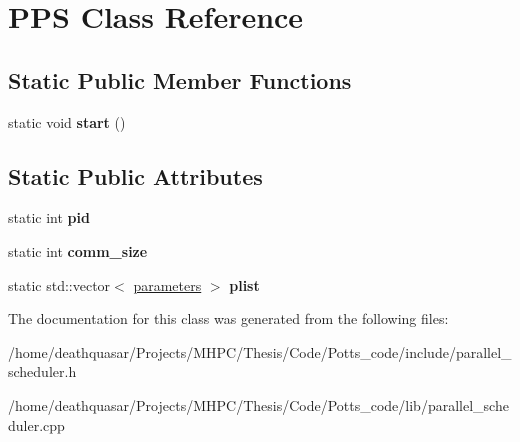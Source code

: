\hypertarget{classPPS}{}\section{P\+PS Class Reference}
\label{classPPS}
\subsection*{Static Public Member Functions}
\begin{DoxyCompactItemize}
\item 
static void {\bfseries start} ()\hypertarget{classPPS_a25cae7ae5a03f02d8c44b2b9b163ebe6}{}\label{classPPS_a25cae7ae5a03f02d8c44b2b9b163ebe6}

\end{DoxyCompactItemize}
\subsection*{Static Public Attributes}
\begin{DoxyCompactItemize}
\item 
static int {\bfseries pid}\hypertarget{classPPS_a4e924fe2bb5ac2451243e7adc4f943ef}{}\label{classPPS_a4e924fe2bb5ac2451243e7adc4f943ef}

\item 
static int {\bfseries comm\+\_\+size}\hypertarget{classPPS_a499131be4386ab41cf334cf42170518e}{}\label{classPPS_a499131be4386ab41cf334cf42170518e}

\item 
static std\+::vector$<$ \hyperlink{structparameters}{parameters} $>$ {\bfseries plist}\hypertarget{classPPS_a0e5dcc27effd740a9d7b8d65356b80c1}{}\label{classPPS_a0e5dcc27effd740a9d7b8d65356b80c1}

\end{DoxyCompactItemize}


The documentation for this class was generated from the following files\+:\begin{DoxyCompactItemize}
\item 
/home/deathquasar/\+Projects/\+M\+H\+P\+C/\+Thesis/\+Code/\+Potts\+\_\+code/include/parallel\+\_\+scheduler.\+h\item 
/home/deathquasar/\+Projects/\+M\+H\+P\+C/\+Thesis/\+Code/\+Potts\+\_\+code/lib/parallel\+\_\+scheduler.\+cpp\end{DoxyCompactItemize}
